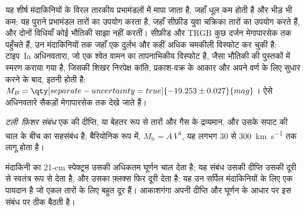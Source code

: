 यह शीर्ष मंदाकिनियों के विरल तारकीय प्रभामंडलों में मापा जाता है, जहाँ
धूल कम होती है और भीड़ भी कम; यह पुराने प्रभामंडल तारों का उपयोग करता है, जहाँ सीफ़ीड
युवा चक्रिका तारों का उपयोग करते हैं, और दोनों विधियाँ कोई भौतिकी साझा नहीं करतीं। सीफ़ीड और
TRGB कुछ दर्जन मेगापारसेक तक पहुँचते हैं, उन मंदाकिनियों तक जहाँ एक दुर्लभ और
कहीं अधिक चमकीली  विस्फोट कर चुकी है: टाइप~Ia अधिनवतारा, जो एक श्वेत वामन का
तापनाभिकीय विस्फोट है, जैसा भौतिकी की पुस्तकों में स्मरण कराया गया है,
जिसकी शिखर निरपेक्ष कांति, प्रकाश-वक्र के आकार और अपने वर्ण के लिए सुधार करने के बाद,
इतनी होती है:
$M_B = \qty[separate-uncertainty=true]{-19.253 \pm 0.027}{mag}$।
ऐसे अधिनवतारे सैकड़ों मेगापारसेक तक देखे जाते हैं।

\begin{definition}[टली--फ़िशर संबंध]\label{def:b3:milky-way-galaxies:tully-fisher}
\emph{टली--फ़िशर संबंध} एक  की
दीप्ति, या बेहतर रूप से तारों और गैस के द्रव्यमान, और
उसके सपाट  की चाल के बीच का सहसंबंध है; बैरियोनिक रूप में,
$M_\mathrm{b} = A\,V^4$, यह लगभग 30 से
\qty{300}{km.s^{-1}} तक लागू होता है।
\end{definition}

मंदाकिनी का 21-cm स्पेक्ट्रम उसकी अधिकतम घूर्णन चाल देता है; यह संबंध
उसकी दीप्ति उसकी दूरी से स्वतंत्र रूप से देता है, और उसका फ़्लक्स
फिर दूरी देता है: यह उन सर्पिल मंदाकिनियों के लिए एक पायदान है जो
एकल तारों के लिए बहुत दूर हैं। आकाशगंगा अपनी दीप्ति और घूर्णन के आधार पर इस संबंध पर ठीक बैठती है।

